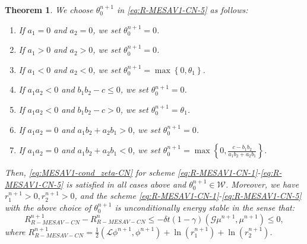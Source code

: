 \documentclass[final,review,onefignum,onetabnum]{siamart190516}
\theoremstyle{plain}
\newtheorem{thm}{Theorem}[section]
\begin{document}
\begin{thm}\label{Th:MESAV1-stability}
We choose $\theta_{0}^{n+1}$ in \eqref{eq:R-MESAV1-CN-5} as follows:
\begin{enumerate}
\item If $a_{1}=0$ and $a_{2}=0$, we set $\theta_{0}^{n+1}=0$.
\item If $a_1 > 0$ and $a_2 > 0$, we set $\theta_{0}^{n+1}=0$.
\item If $a_1 < 0$ and $a_2 < 0$, we set $\theta_{0}^{n+1}=\max \left\{0, \theta_{1}\right\}$.
\item If $a_1 a_2 < 0$ and $b_1b_2-c \leq 0$, we set $\theta_{0}^{n+1}=0$. 
\item If $a_1 a_2 < 0$ and $b_1b_2-c > 0$, we set $\theta_{0}^{n+1}=\theta_{1}$. 
\item If $a_{1}a_{2}=0$ and $a_1b_2+a_2b_1>0$, we set $\theta_{0}^{n+1}=0$.  
\item If $a_{1}a_{2}=0$ and $a_1b_2+a_2b_1<0$, we set $\theta_{0}^{n+1}=\max \left\{0, \frac{c-b_1b_2}{a_1b_2+a_2b_1}\right\}$.
	\end{enumerate}
Then, \eqref{eq:MESAV1-cond_zeta-CN} for scheme \eqref{eq:R-MESAV1-CN-1}-\eqref{eq:R-MESAV1-CN-5} is satisfied in all cases above and  $\theta_0^{n+1}\in \mathcal{W}$.
Moreover, we have $r_{1}^{n+1}>0, r_{2}^{n+1}>0$, and the scheme \eqref{eq:R-MESAV1-CN-1}-\eqref{eq:R-MESAV1-CN-5} with the above choice of  $\theta_0^{n+1}$ is unconditionally energy stable in the sense that:
\begin{equation}\label{eq:MESAV1-stability-CN}
	R_{R-MESAV-CN}^{n+1} - R_{R-MESAV-CN}^{n} \leq -\delta t (1-\gamma) \left(\mathcal{G} \mu^{n+1}, \mu^{n+1}\right) \leq 0,
\end{equation}
where $R_{R-MESAV-CN}^{n+1}=\frac{1}{2}\left(\mathcal{L} \phi^{n+1}, \phi^{n+1}\right) +\ln(r_{1}^{n+1})+\ln(r_{2}^{n+1})$. 
\end{thm}
\end{document}
